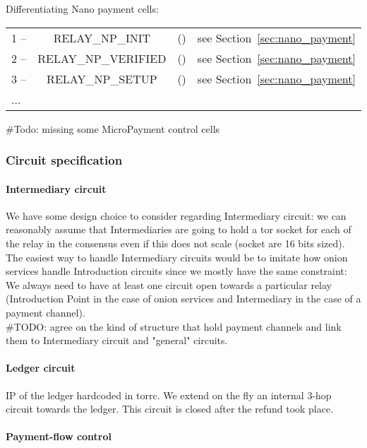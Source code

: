 \documentclass{article}
\begin{document}
Differentiating Nano payment cells:

\begin{center}
\begin{tabular}{l c c r}
1 -- & RELAY\_NP\_INIT & () & see Section~\ref{sec:nano_payment} \\
2 -- & RELAY\_NP\_VERIFIED & () & see Section~\ref{sec:nano_payment} \\
3 -- & RELAY\_NP\_SETUP & () & see Section~\ref{sec:nano_payment}\\
... & &
\end{tabular}
\end{center}
      \#Todo: missing some MicroPayment control cells
 \subsubsection{Circuit specification}

 	\paragraph*{Intermediary circuit}

	We have some design choice to consider regarding Intermediary circuit: we can reasonably assume that Intermediaries are going to hold a tor socket for each of the relay in the consensus even if this does not scale (socket are 16 bits sized). The easiest way to handle Intermediary circuits would be to imitate how onion services handle Introduction circuits since we mostly have the same constraint: We always need to have at least one circuit open towards a particular relay (Introduction Point in the case of onion services and Intermediary in the case of a payment channel).\\
	\#TODO: agree on the kind of structure that hold payment channels and link them to Intermediary circuit and "general" circuits.

 	\paragraph*{Ledger circuit}

 	IP of the ledger hardcoded in torrc. We extend on the fly an internal 3-hop circuit towards the ledger. This circuit is closed after the refund took place.

 	\paragraph*{Payment-flow control}
\end{document}
